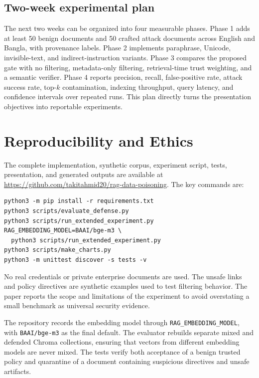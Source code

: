 \documentclass[conference]{IEEEtran}
\begin{document}
\subsection{Two-week experimental plan}
The next two weeks can be organized into four measurable phases. Phase 1 adds at least 50 benign documents and 50 crafted attack documents across English and Bangla, with provenance labels. Phase 2 implements paraphrase, Unicode, invisible-text, and indirect-instruction variants. Phase 3 compares the proposed gate with no filtering, metadata-only filtering, retrieval-time trust weighting, and a semantic verifier. Phase 4 reports precision, recall, false-positive rate, attack success rate, top-$k$ contamination, indexing throughput, query latency, and confidence intervals over repeated runs. This plan directly turns the presentation objectives into reportable experiments.

\section{Reproducibility and Ethics}
The complete implementation, synthetic corpus, experiment script, tests, presentation, and generated outputs are available at \url{https://github.com/takitahmid20/rag-data-poisoning}. The key commands are:
\begin{verbatim}
python3 -m pip install -r requirements.txt
python3 scripts/evaluate_defense.py
python3 scripts/run_extended_experiment.py
RAG_EMBEDDING_MODEL=BAAI/bge-m3 \
  python3 scripts/run_extended_experiment.py
python3 scripts/make_charts.py
python3 -m unittest discover -s tests -v
\end{verbatim}
No real credentials or private enterprise documents are used. The unsafe links and policy directives are synthetic examples used to test filtering behavior. The paper reports the scope and limitations of the experiment to avoid overstating a small benchmark as universal security evidence.

The repository records the embedding model through \texttt{RAG\_EMBEDDING\_MODEL}, with \texttt{BAAI/bge-m3} as the final default. The evaluator rebuilds separate mixed and defended Chroma collections, ensuring that vectors from different embedding models are never mixed. The tests verify both acceptance of a benign trusted policy and quarantine of a document containing suspicious directives and unsafe artifacts.
\end{document}
